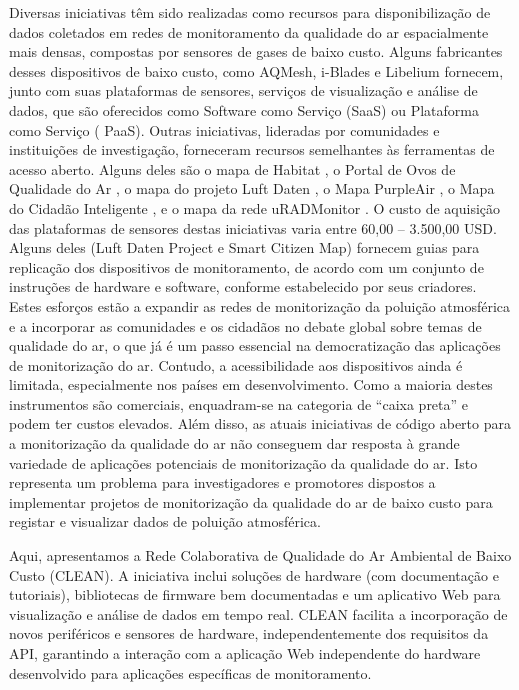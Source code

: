 Diversas iniciativas têm sido realizadas como recursos para disponibilização de dados coletados em redes de monitoramento da qualidade do ar espacialmente mais densas, compostas por sensores de gases de baixo custo. Alguns fabricantes desses dispositivos de baixo custo, como AQMesh, i-Blades e Libelium fornecem, junto com suas plataformas de sensores, serviços de visualização e análise de dados, que são oferecidos como Software como Serviço (SaaS) ou Plataforma como Serviço ( PaaS). Outras iniciativas, lideradas por comunidades e instituições de investigação, forneceram recursos semelhantes às ferramentas de acesso aberto. Alguns deles são o mapa de Habitat \cite{HabitatMap2023AirCasting}, o Portal de Ovos de Qualidade do Ar \cite{AirQualityEgg2023AirPortal}, o mapa do projeto Luft Daten \cite{Sensor.Community2023LuftMap}, o Mapa PurpleAir \cite{PurpleAir2023PurpleAirMonitoring}, o Mapa do Cidadão Inteligente \cite{SmartCitizen2023SmartCitizen}, e o mapa da rede uRADMonitor \cite{uRADMonitor2023PM2.5URADMonitor}. O custo de aquisição das plataformas de sensores destas iniciativas varia entre 60,00 – 3.500,00 USD. Alguns deles (Luft Daten Project e Smart Citizen Map) fornecem guias para replicação dos dispositivos de monitoramento, de acordo com um conjunto de instruções de hardware e software, conforme estabelecido por seus criadores. Estes esforços estão a expandir as redes de monitorização da poluição atmosférica e a incorporar as comunidades e os cidadãos no debate global sobre temas de qualidade do ar, o que já é um passo essencial na democratização das aplicações de monitorização do ar. Contudo, a acessibilidade aos dispositivos ainda é limitada, especialmente nos países em desenvolvimento. Como a maioria destes instrumentos são comerciais, enquadram-se na categoria de “caixa preta” e podem ter custos elevados. Além disso, as atuais iniciativas de código aberto para a monitorização da qualidade do ar não conseguem dar resposta à grande variedade de aplicações potenciais de monitorização da qualidade do ar. Isto representa um problema para investigadores e promotores dispostos a implementar projetos de monitorização da qualidade do ar de baixo custo para registar e visualizar dados de poluição atmosférica.

Aqui, apresentamos a Rede Colaborativa de Qualidade do Ar Ambiental de Baixo Custo (CLEAN). A iniciativa inclui soluções de hardware (com documentação e tutoriais), bibliotecas de firmware bem documentadas e um aplicativo Web para visualização e análise de dados em tempo real. CLEAN facilita a incorporação de novos periféricos e sensores de hardware, independentemente dos requisitos da API, garantindo a interação com a aplicação Web independente do hardware desenvolvido para aplicações específicas de monitoramento.

